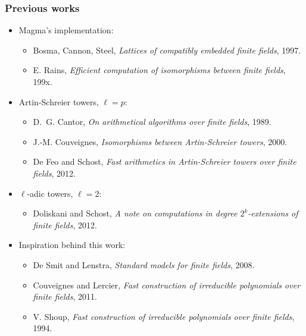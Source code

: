 \documentclass[12pt]{beamer}
\begin{document}
{
\begin{frame}
	\frametitle{Previous works}

	\begin{itemize}
          \item Magma's implementation:
            \begin{itemize}
          \setlength{\itemindent}{0pt}
            \item Bosma, Cannon, Steel, \textit{Lattices of compatibly embedded finite fields}, 1997.
            \item E. Rains, \textit{Efficient computation of isomorphisms between finite fields}, 199x.
            \end{itemize}
		\item Artin-Schreier towers, $\ell=p$:
		\begin{itemize}
			\item D.~G. Cantor, \textit{On arithmetical algorithms over finite fields}, 1989.
			\item J.-M. Couveignes, \textit{Isomorphisms between {A}rtin-{S}chreier towers}, 2000.
			\item De Feo and Schost, \textit{Fast arithmetics in {A}rtin-{S}chreier towers over finite fields}, 2012.
		\end{itemize}
		\item $\ell$-adic towers, $\ell = 2$:
		\begin{itemize}
			\item Doliskani and Schost, \textit{A note on computations in degree $2^k$-extensions of finite fields}, 2012.
		\end{itemize}
		\item Inspiration behind this work:
		\begin{itemize}
			\item De Smit and Lenstra, \textit{Standard models for finite fields}, 2008.
			\item Couveignes and Lercier, \textit{Fast construction of irreducible polynomials over finite fields}, 2011.
			\item V. Shoup, \textit{Fast construction of irreducible polynomials over finite fields}, 1994.
		\end{itemize}
	\end{itemize}
\end{frame}
}
\end{document}
